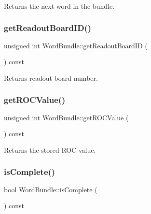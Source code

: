 Returns the next word in the bundle. 

\mbox{\label{class_word_bundle_a595de21d0dabc8b99a8d28053c0370fc}} 
\subsubsection{\texorpdfstring{get\+Readout\+Board\+I\+D()}{getReadoutBoardID()}}
{\footnotesize\ttfamily unsigned int Word\+Bundle\+::get\+Readout\+Board\+ID (\begin{DoxyParamCaption}{ }\end{DoxyParamCaption}) const\hspace{0.3cm}{\ttfamily [inline]}}



Returns readout board number. 

\mbox{\label{class_word_bundle_ad2c91f230ac93d19900eba6b2c64d0e9}} 
\subsubsection{\texorpdfstring{get\+R\+O\+C\+Value()}{getROCValue()}}
{\footnotesize\ttfamily unsigned int Word\+Bundle\+::get\+R\+O\+C\+Value (\begin{DoxyParamCaption}{ }\end{DoxyParamCaption}) const\hspace{0.3cm}{\ttfamily [inline]}}



Returns the stored R\+OC value. 

\mbox{\label{class_word_bundle_a0a817b8d4266b5c2418743bf46ef5dee}} 
\subsubsection{\texorpdfstring{is\+Complete()}{isComplete()}}
{\footnotesize\ttfamily bool Word\+Bundle\+::is\+Complete (\begin{DoxyParamCaption}{ }\end{DoxyParamCaption}) const\hspace{0.3cm}{\ttfamily [inline]}}




